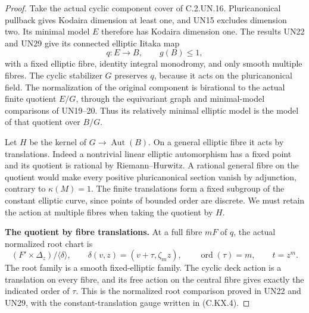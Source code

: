 \begin{proof}
Take the actual cyclic component cover of C.2.UN.16.
Pluricanonical pullback gives Kodaira dimension at least
one, and UN15 excludes dimension two. Its minimal model
$E$ therefore has Kodaira dimension one. The results
UN22 and UN29 give its connected elliptic Iitaka map
\[
 q:E\longrightarrow B,\qquad g(B)\le1,                 \tag{C.EQ.2}
\]
with a fixed elliptic fibre, identity integral monodromy,
and only smooth multiple fibres. The cyclic stabilizer
$G$ preserves $q$, because it acts on the pluricanonical
field. The normalization of the original component is
birational to the actual finite quotient $E/G$, through
the equivariant graph and minimal-model comparisons of
UN19--20. Thus its relatively minimal elliptic model is
the model of that quotient over $B/G$.

Let $H$ be the kernel of $G\to\operatorname{Aut}(B)$.
On a general elliptic fibre it acts by translations.
Indeed a nontrivial linear elliptic automorphism has a
fixed point and its quotient is rational by
Riemann--Hurwitz. A rational general fibre on the
quotient would make every positive pluricanonical
section vanish by adjunction, contrary to $\kappa(M)=1$.
The finite translations form a fixed subgroup of the
constant elliptic curve, since points of bounded order
are discrete. We must retain the action at multiple
fibres when taking the quotient by $H$.

\par\medskip\noindent\textbf{The quotient by fibre translations.}
At a full fibre $mF$ of $q$, the actual normalized root
chart is
\[
 (F'\times\Delta_z)/\langle\delta\rangle,
 \qquad \delta(v,z)=(v+\tau,\zeta_m z),
 \qquad \operatorname{ord}(\tau)=m,
 \qquad t=z^m.                                        \tag{C.EQ.3}
\]
The root family is a smooth fixed-elliptic family.
The cyclic deck action is a translation on every fibre,
and its free action on the central fibre gives exactly
the indicated order of $\tau$. This is the normalized
root comparison proved in UN22 and UN29, with the
constant-translation gauge written in (C.KX.4).


\end{proof}
